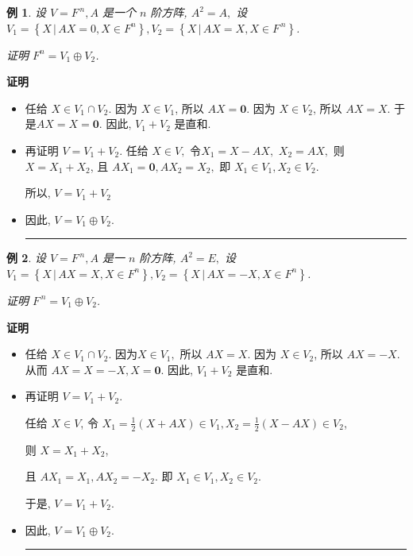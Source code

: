 \documentclass[13pt]{beamer}
\newtheorem{exa}{例}
\def\qed{\nopagebreak\hfill{\rule{4pt}{7pt}}\medbreak}
\def\pf{{\bf 证明~~ }}
\def\0{\mathbf{0}}
\begin{document}
\begin{frame}
\begin{exa}
	设 $V=F^{\, n}, A$ 是一个 $n$ 阶方阵, $A^{2}=A,$ 设 $V_{1}=\left\{X \, | \, A X=0, X \in F^{n}\right\}, V_{2}=\left\{X \, | \,  A X=X, X \in F^{\, n}\right\}$.
	
证明 $F^{n}=V_{1} \oplus V_{2}$.
\end{exa}
\pf 
\begin{itemize}
\item 任给 $X \in V_{1} \cap V_{2}$. 因为 $X \in V_{1}$, 所以  $A X=\0$. 因为  $X \in V_{2}$, 所以 $A X=X$. 于是$A X=X=\0$. 因此, $V_{1}+V_{2}$ 是直和.

\item 再证明 $V=V_{1}+V_{2}$. 任给 $X \in V,$ 
令$X_{1}=X-A X,$ $X_{2}= A X,$ 则
 $X=X_{1}+X_{2}$, 且
 $A X_{1}=\0, A X_{2}=X_{2},$ 
即 $X_{1} \in V_{1}, X_{2} \in V_{2}.$ 

所以, $V=V_{1}+V_{2}$
\item 因此, $V=V_{1} \oplus V_{2}$. \qed
\end{itemize}

\end{frame}

\begin{frame}
\begin{exa}
设 $V=F^{\, n}, A$ 是一 $n$ 阶方阵, $A^{2}=E,$ 设 $V_{1}=\left\{X \, | \,A X=X, X \in F^{n}\right\}, V_{2}=\left\{X  \, | \, A X=-X, X \in F^{n}\right\}$.
	
证明 $F^{\, n}=V_{1} \oplus V_{2}$.
\end{exa}
\pf 
\begin{itemize}
\item 任给 $X \in V_{1} \cap V_{2}$. 因为$X \in V_{1},$ 所以 $A X=X$. 因为 $X \in V_{2}$, 所以 $A X=-X.$ 从而 $A X=X=-X, X=\0$. 因此, $V_{1}+V_{2}$ 是直和.

\item 再证明 $V=V_{1}+V_{2}$. 

任给 $X \in V$, 
令 $X_{1}=\frac{1}{2}(X+A X) \in V_{1}, X_{2}=\frac{1}{2}(X-A X) \in V_{2}$,

则 $X=X_1+X_2$, 
 

且 $A X_{1}=X_{1}, A X_{2}=-X_{2}.$
即 $X_{1} \in V_{1}, X_{2} \in V_{2}.$ 

于是, $V=V_{1}+V_{2}$.
\item 因此, $V=V_{1} \oplus V_{2}$. \qed
\end{itemize}
\end{frame}
\end{document}
